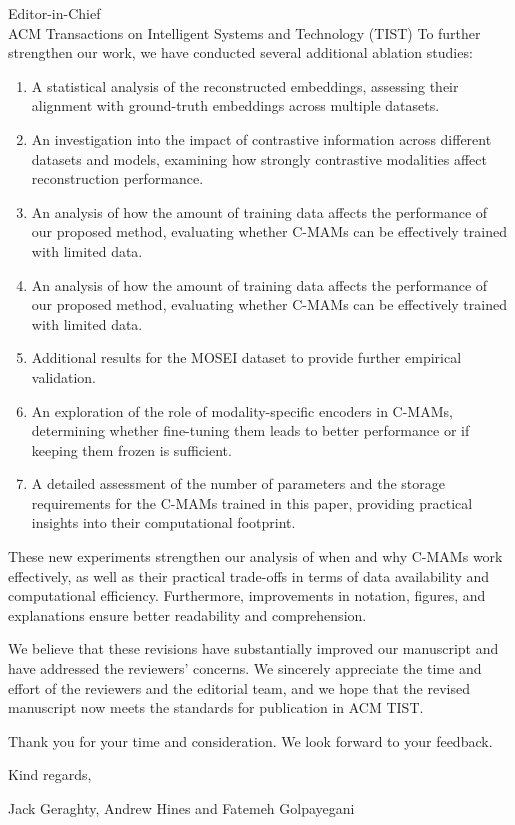 \documentclass[a4paper,12pt]{letter}
\begin{document}
\begin{letter}{Editor-in-Chief\\ACM Transactions on Intelligent Systems and Technology (TIST)}
To further strengthen our work, we have conducted several additional ablation studies:
\begin{enumerate}
    \item A statistical analysis of the reconstructed embeddings, assessing their alignment with ground-truth embeddings across multiple datasets.
    \item An investigation into the impact of contrastive information across different datasets and models, examining how strongly contrastive modalities affect reconstruction performance.
    \item An analysis of how the amount of training data affects the performance of our proposed method, evaluating whether C-MAMs can be effectively trained with limited data.
    \item An analysis of how the amount of training data affects the performance of our proposed method, evaluating whether C-MAMs can be effectively trained with limited data. 
    \item Additional results for the MOSEI dataset to provide further empirical validation.
    \item An exploration of the role of modality-specific encoders in C-MAMs, determining whether fine-tuning them leads to better performance or if keeping them frozen is sufficient.
    \item A detailed assessment of the number of parameters and the storage requirements for the C-MAMs trained in this paper, providing practical insights into their computational footprint.
\end{enumerate}

These new experiments strengthen our analysis of when and why C-MAMs work effectively, as well as their practical trade-offs in terms of data availability and computational efficiency. Furthermore, improvements in notation, figures, and explanations ensure better readability and comprehension.

We believe that these revisions have substantially improved our manuscript and have addressed the reviewers' concerns. We sincerely appreciate the time and effort of the reviewers and the editorial team, and we hope that the revised manuscript now meets the standards for publication in ACM TIST.

Thank you for your time and consideration. We look forward to your feedback.\newline

\noindent Kind regards,

Jack Geraghty, Andrew Hines and Fatemeh Golpayegani 

\end{letter}
\end{document}
